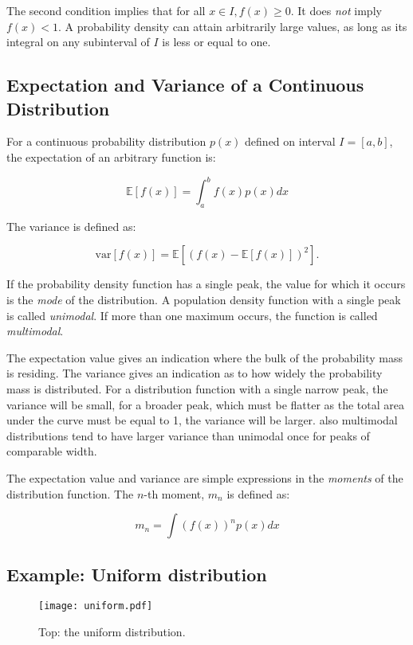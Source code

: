 The second condition implies that for all $x \in I, f(x) \ge 0$. It does \emph{not} imply $f(x) < 1$. A probability density  can attain arbitrarily large values,
as long as its integral on any subinterval of $I$ is less or equal to one.

\subsection{Expectation and Variance of a Continuous Distribution}

For a continuous probability distribution $p(x)$ defined on interval $I = [a,b]$, the expectation of an arbitrary function is:

\begin{equation}
\mathbb{E}[f(x)] = \int^b_a f(x)p(x) dx
\end{equation}

The variance is defined as:

\begin{equation}
  \mbox{var}[f(x)] =  \mathbb{E}[(f(x) - \mathbb{E}[f(x)])^2].
\end{equation}


If the probability density function has a single peak, the value for which it occurs is the \emph{mode} of the distribution. A population density function
with a single peak is called \emph{unimodal}. If more than one maximum occurs, the function is called \emph{multimodal}.
  
The expectation value gives an indication where the bulk of the probability mass is residing. The variance gives an indication as to how widely the probability
mass is distributed. For a distribution function with a single narrow peak, the variance will be small, for a broader peak, which must be flatter as the
total area under the curve must be equal to 1, the variance will be larger. also multimodal distributions tend to have larger variance than unimodal once for peaks of
comparable width.

The expectation value and variance are simple expressions in the \emph{moments} of the distribution function. The $n$-th moment, $m_n$ is defined
as:

$$
m_n = \int (f(x))^np(x) dx
$$
  
\subsection{Example: Uniform distribution}

\begin{figure}[!h]
\begin{center}
\texttt{[image: uniform.pdf]} 
\end{center}
\caption{Top: the uniform distribution.}
\label{fig-uniform}
\end{figure}


